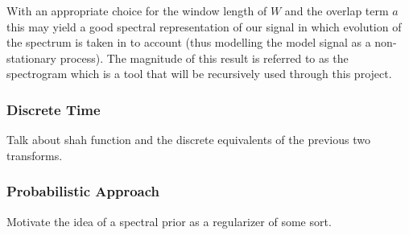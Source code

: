 \documentclass[10pt]{article}
\begin{document}
With an appropriate choice for the window length of $W$ and the overlap term $a$ this may yield a good spectral representation of our signal in which evolution of the spectrum is taken in to account (thus modelling the model signal as a non-stationary process). The magnitude of this result is referred to as the spectrogram which is a tool that will be recursively used through this project.

\subsubsection{Discrete Time}

Talk about shah function and the discrete equivalents of the previous two transforms.

\subsubsection{Probabilistic Approach}

Motivate the idea of a spectral prior as a regularizer of some sort.
\end{document}
